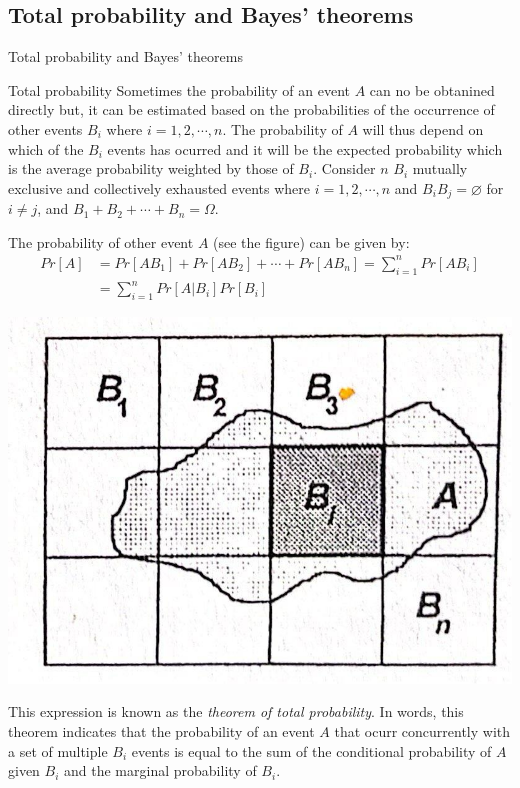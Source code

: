 \documentclass[8pt]{beamer}
\begin{document}
\subsection{Total probability and Bayes' theorems}
\begin{frame}{Total probability and Bayes' theorems}

    \begin{block}{Total probability}
        Sometimes the probability of an event $A$ can no be obtanined directly but, it can be estimated based on the probabilities of the occurrence of other events $B_i$ where $i = 1, 2, \cdots, n$. The probability of $A$ will thus depend on which of the $B_i$ events has ocurred and it will be the expected probability which is the average probability weighted by those of $B_i$. Consider $n$ $B_i$ mutually exclusive and collectively exhausted events where $i = 1, 2, \cdots, n$ and $B_i B_j = \varnothing$ for $i \neq j$, and $B_1 + B_2 + \cdots + B_n = \Omega$.

        \begin{minipage}{0.7\textwidth}
            The probability of other event $A$ (see the figure) can be given by:
        \begin{align*}
            Pr[A] &= Pr[A B_1 ] + Pr[A B_2 ] + \cdots + Pr[A B_n ] = \sum_{i=1}^n Pr[A B_i] \\
                  &= \sum_{i=1}^n Pr[A | B_i ] Pr[B_i] 
        \end{align*}
        \end{minipage}
        \hfill
        \begin{minipage}{0.3\textwidth}
            \includegraphics[width=\linewidth]{fi225.jpeg}
        \end{minipage}
        This expression is known as the \emph{theorem of total probability}. In words, this theorem indicates that the probability of an event $A$ that ocurr concurrently with a set of multiple $B_i$ events  is equal to the sum of the conditional probability of $A$ given $B_i$ and the marginal probability of $B_i$.
    \end{block}
\end{frame}
\end{document}
